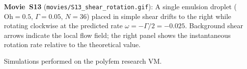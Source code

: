 \documentclass[aps,pre,twocolumn,floatfix,longbibliography]{revtex4-2}
\begin{document}
\textbf{Movie~S13} (\texttt{movies/S13\_shear\_rotation.gif}):
A single emulsion droplet ($\mathrm{Oh} = 0.5$, $\Gamma = 0.05$, $N = 36$)
placed in simple shear drifts to the right while rotating clockwise at the
predicted rate $\omega = -\Gamma/2 = -0.025$.  Background shear arrows indicate
the local flow field; the right panel shows the instantaneous rotation rate
relative to the theoretical value.

\acknowledgments
Simulations performed on the polyfem research VM.


\end{document}

